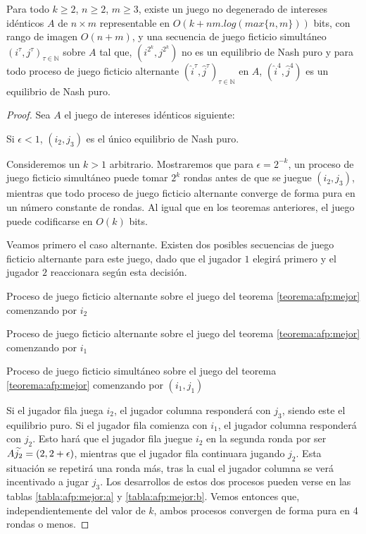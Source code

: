 \begin{theorem} \label{teorema:afp:mejor}
    Para todo $k \geq 2$, $n\geq 2$, $m\geq 3$, existe un juego no degenerado de intereses idénticos $A$ de $n\times m$ representable en $O(k+nm. log(max\{n,m\}))$ bits, con rango de imagen $O(n+m)$, y una secuencia de juego ficticio simultáneo $(i^\tau, j^\tau)_{\tau \in \mathbb{N}}$ sobre $A$ tal que, $(i^{2^k}, j^{2^k})$ no es un equilibrio de Nash puro y para todo proceso de juego ficticio alternante $(\widehat{i}^\tau, \widehat{j}^\tau)_{\tau \in \mathbb{N}}$ en $A$, $(\widehat{i}^4, \widehat{j}^4)$ es un equilibrio de Nash puro.
\end{theorem}
\begin{proof}
    Sea $A$ el juego de intereses idénticos siguiente:

    

    Si $\epsilon < 1$, $(i_2, j_3)$ es el único equilibrio de Nash puro.

    Consideremos un $k > 1$ arbitrario. Mostraremos que para $\epsilon = 2^{-k}$, un proceso de juego ficticio simultáneo puede tomar $2^k$ rondas antes de que se juegue $(i_2, j_3)$, mientras que todo proceso de juego ficticio alternante converge de forma pura en un número constante de rondas. Al igual que en los teoremas anteriores, el juego puede codificarse en $O(k)$ bits.

    Veamos primero el caso alternante. Existen dos posibles secuencias de juego ficticio alternante para este juego, dado que el jugador $1$ elegirá primero y el jugador $2$ reaccionara según esta decisión.

    \begin{table}
        \centering
        
        \caption{Proceso de juego ficticio alternante sobre el juego del teorema \ref{teorema:afp:mejor} comenzando por $i_2$}
        \label{tabla:afp:mejor:b}
        \centering
        
        \caption{Proceso de juego ficticio alternante sobre el juego del teorema \ref{teorema:afp:mejor} comenzando por $i_1$}
        \label{tabla:afp:mejor:a}
        \centering
        
        \caption{Proceso de juego ficticio simultáneo sobre el juego del teorema \ref{teorema:afp:mejor} comenzando por $(i_1, j_1)$}
        \label{tabla:afp:mejor:c}
    \end{table}

    Si el jugador fila juega $i_2$, el jugador columna responderá con $j_3$, siendo este el equilibrio puro. Si el jugador fila comienza con $i_1$, el jugador columna responderá con $j_2$. Esto hará que el jugador fila juegue $i_2$ en la segunda ronda por ser $A\widetilde{j_2} = (2, 2 + \epsilon)$, mientras que el jugador fila continuara jugando $j_2$. Esta situación se repetirá una ronda más, tras la cual el jugador columna se verá incentivado a jugar $j_3$. Los desarrollos de estos dos procesos pueden verse en las tablas \ref{tabla:afp:mejor:a} y \ref{tabla:afp:mejor:b}. Vemos entonces que, independientemente del valor de $k$, ambos procesos convergen de forma pura en 4 rondas o menos.


\end{proof}
